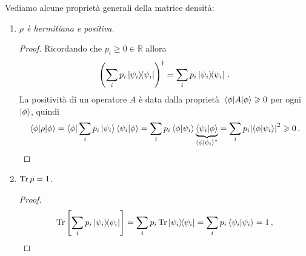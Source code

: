 \vspace{1cm}
\noindent {}
\vspace{0.5cm}

\noindent Vediamo alcune proprietà generali della matrice densità:
\begin{enumerate}
    \item \textit{$\rho$ è hermitiana e positiva}. 
    \begin{proof}
        Ricordando che $p_i \geqslant 0 \in \mathbb{R}$ allora
        \begin{equation*}
            \left( \sum_i p_i \ketbra{\psi_i} \right)^\dag = \sum_i p_i \ketbra{\psi_i} \, .
        \end{equation*}
        La positività di un operatore $A$ è data dalla proprietà $\expval{A}{\phi} \geqslant 0$ per ogni $\ket{\phi}$, quindi
        \begin{equation*}
            \expval{\rho}{\phi} = \bra{\phi} \sum_i p_i \ket{\psi_i} \braket{\psi_i}{\phi} = \sum_i p_i \braket{\phi}{\psi_i} \underbrace{\braket{\psi_i}{\phi}}_{\braket{\phi}{\psi_i}^\ast} = \sum_i p_i \abs{\braket{\phi}{\psi_i}}^2 \geqslant 0 \, .
        \end{equation*}
    \end{proof}
    
    \item $\Tr \rho = 1$.
    \begin{proof}
        \begin{equation*}
            \Tr \left[ \sum_i p_i \ketbra{\psi_i} \right] = \sum_i p_i \Tr \ketbra{\psi_i} = \sum_i p_i \braket{\psi_i} = 1 \, ,
        \end{equation*}
    \end{proof}
    

\end{enumerate}
